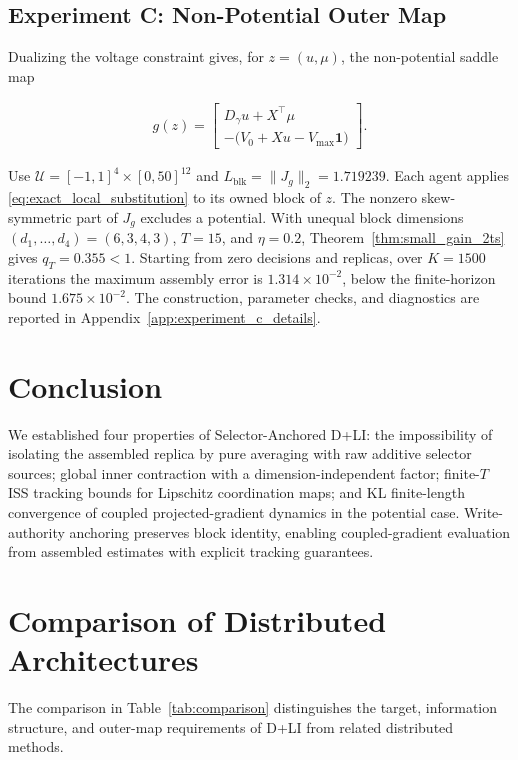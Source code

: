 \documentclass[letterpaper, 10 pt, conference]{ieeeconf} %
\begin{document}
\subsection{Experiment C: Non-Potential Outer Map}\label{subsec:exp_saddle}
Dualizing the voltage constraint gives, for \(z=(u,\mu)\), the non-potential saddle map

\begin{align}
g(z)
=
\begin{bmatrix}
D_\gamma u+X^\top\mu\\[1mm]
-\bigl(V_0+Xu-V_{\max}\mathbf 1\bigr)
\end{bmatrix}.
\end{align}

Use \(\mathcal U=[-1,1]^4\times[0,50]^{12}\) and \(L_{\mathrm{blk}}=\|J_g\|_2=1.719239\). Each agent applies \eqref{eq:exact_local_substitution} to its owned block of \(z\). The nonzero skew-symmetric part of \(J_g\) excludes a potential. With unequal block dimensions \((d_1,\dots,d_4)=(6,3,4,3)\), \(T=15\), and \(\eta=0.2\), Theorem~\ref{thm:small_gain_2ts} gives \(q_T=0.355<1\). Starting from zero decisions and replicas, over \(K=1500\) iterations the maximum assembly error is \(1.314\times10^{-2}\), below the finite-horizon bound \(1.675\times10^{-2}\).
The construction, parameter checks, and diagnostics are reported in Appendix~\ref{app:experiment_c_details}.

\section{Conclusion}
We established four properties of Selector-Anchored D+LI: the impossibility of isolating the assembled replica by pure averaging with raw additive selector sources; global inner contraction with a dimension-independent factor; finite-$T$ ISS tracking bounds for Lipschitz coordination maps; and KL finite-length convergence of coupled projected-gradient dynamics in the potential case. Write-authority anchoring preserves block identity, enabling coupled-gradient evaluation from assembled estimates with explicit tracking guarantees. %

\appendices

\section{Comparison of Distributed Architectures}
\label{app:comparison}
The comparison in Table~\ref{tab:comparison} distinguishes the target, information structure, and outer-map requirements of D+LI from related distributed methods.
\end{document}
